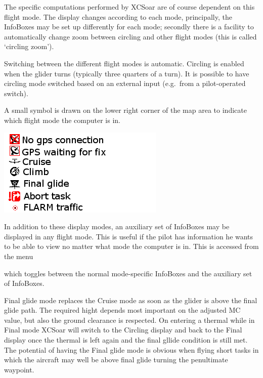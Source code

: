 \documentclass[a4paper,12pt]{refrep}
\begin{document}
The specific computations performed by XCSoar are of course dependent
on this flight mode.  The display changes according to each mode, principally,
the InfoBoxes may be set up differently for each mode; secondly there
is a facility to automatically change zoom between circling and other
flight modes (this is called `circling zoom').

Switching between the different flight modes is automatic.  Circling
is enabled when the glider turns (typically three quarters of a turn).
It is possible to have circling mode switched based on an external
input (e.g.\ from a pilot-operated switch).

A small symbol is drawn on the lower right corner of the map area to
indicate which flight mode the computer is in.

\includegraphics[angle=0,width=0.7\linewidth,keepaspectratio='true']{figures/symbology.png}

In addition to these display modes, an auxiliary set of InfoBoxes may
be displayed in any flight mode.  This is useful if the pilot has
information he wants to be able to view no matter what mode the
computer is in.  This is accessed from the menu
\begin{quote}
\blink{}\blink{}
\end{quote}

which toggles between the normal mode-specific InfoBoxes and
the auxiliary set of InfoBoxes.

Final glide mode replaces the Cruise mode as soon as the glider is above the
final glide path. The required hight depends most important on the adjusted MC
value, but also the ground clearance is respected. On entering a thermal while
in Final mode XCSoar will switch to the Circling display and back to the Final
display once the thermal is left again and the final gllide condition is still
met. The potential of having the Final glide mode is obvious when
flying short tasks in which the aircraft may well be above final glide turning the penultimate
waypoint.
\end{document}
